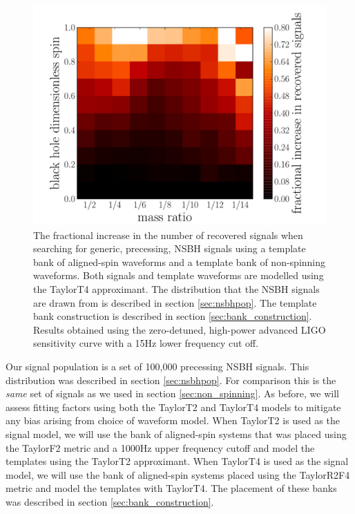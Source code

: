 \begin{figure}
\begin{center}
\includegraphics[width=1.0\textwidth]
{papers/nsbh_effectualness/figure15.pdf}
\end{center}
\caption{\label{fig:aspinimpr}
The fractional increase in the number of recovered signals when
searching for generic, precessing, NSBH signals using
a template bank of aligned-spin waveforms and a template bank of non-spinning
waveforms. Both signals and template waveforms are modelled using the TaylorT4
approximant. The distribution that the NSBH
signals are drawn from is described in section \ref{sec:nsbhpop}. The
template bank construction is described in section \ref{sec:bank_construction}.
Results obtained
using the zero-detuned, high-power advanced LIGO sensitivity curve with a 15Hz
lower frequency cut off.
}
\end{figure}

Our signal population is a set of 100,000 precessing \ac{NSBH} signals. This 
distribution was
described in section \ref{sec:nsbhpop}. For comparison this is the
\emph{same} set of signals as we used in section \ref{sec:non_spinning}.
As before, we will assess fitting factors using both the TaylorT2 and TaylorT4
models to mitigate any bias arising from choice of waveform model.
When TaylorT2 is used as the signal model, we will use the bank of aligned-spin
systems that was placed using the TaylorF2 metric and a 1000Hz
upper frequency cutoff and model the templates using the TaylorT2 approximant.
When TaylorT4 is used as the signal model, we will use the bank of aligned-spin
systems placed using the TaylorR2F4 metric and model the templates with
TaylorT4. The placement of these banks was described in section
\ref{sec:bank_construction}.

